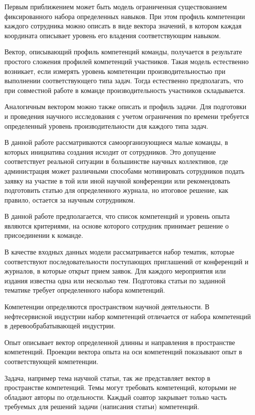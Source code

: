 Первым приближением может быть модель ограниченная существованием фиксированного набора определенных навыков. 
При этом профиль компетенции каждого сотрудника можно описать в виде вектора значений, в котором каждая координата описывает уровень его владения соответствующим навыком.

Вектор, описывающий профиль компетенций команды, получается в результате простого сложения профилей компетенций участников. 
Такая модель естественно возникает, если измерять уровень компетенции производительностью при выполнении соответствующего типа задач. 
Тогда естественно предполагать, что при совместной работе в команде производительность участников складывается.

Аналогичным вектором можно также описать и профиль задачи.
Для подготовки и проведения научного исследования с учетом ограничения по времени требуется определенный уровень производительности для каждого типа задач.

В данной работе рассматриваются самоорганизующиеся малые команды, в которых инициатива создания исходит от сотрудников. 
Это допущение соответствует реальной ситуации в большинстве научных коллективов, где администрация может различными способами мотивировать сотрудников подать заявку на участие в той или иной научной конференции или рекомендовать подготовить статью для определенного журнала, но итоговое решение, как правило, остается за научным сотрудником.

В данной работе предполагается, что список компетенций и уровень опыта  являются критериями, на основе которого сотрудник принимает решение о присоединении к команде.

В качестве входных данных модели рассматривается набор тематик, которые соответствуют последовательности поступающих приглашений от конференций и журналов, в которые открыт прием заявок. 
Для каждого мероприятия или издания известна одна или несколько тем. 
Подготовка статьи по заданной тематике требует определенного набора компетенций. 

Компетенции определяются пространством научной деятельности. В нефтесервисной индустрии набор компетенций отличается от набора компетенций в деревообрабатывающей индустрии. 

Опыт описывает вектор определенной длинны и направления в пространстве компетенций. 
Проекции вектора опыта на оси компетенций показывают опыт в соответствующей компетенции. 

Задача, например тема научной статьи, так же представляет вектор в пространстве компетенций. 
Темы могут требовать компетенций, которыми не обладают авторы по отдельности. 
Каждый соавтор закрывает только часть требуемых для решений задачи (написания статьи) компетенций.  

